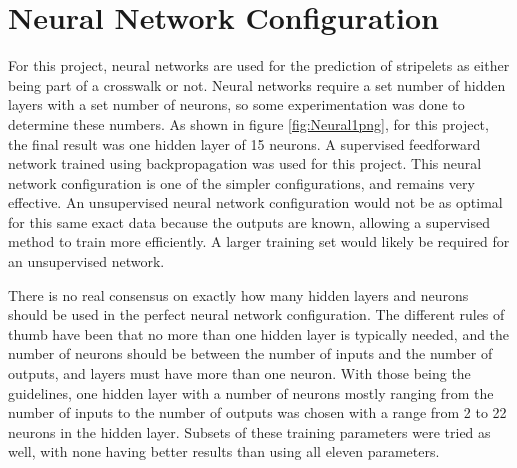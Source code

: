 \documentclass[12pt]{ucthesis}
\begin{document}
\section{Neural Network Configuration}
For this project, neural networks are used for the prediction of stripelets as either being part of a crosswalk or not. Neural networks require a set number of hidden layers with a set number of neurons, so some experimentation was done to determine these numbers. As shown in figure \ref{fig:Neural1png}, for this project, the final result was one hidden layer of 15 neurons. A supervised feedforward network trained using backpropagation was used for this project. This neural network configuration is one of the simpler configurations, and remains very effective. An unsupervised neural network configuration would not be as optimal for this same exact data because the outputs are known, allowing a supervised method to train more efficiently. A larger training set would likely be required for an unsupervised network. 

 

There is no real consensus on exactly how many hidden layers and neurons should be used in the perfect neural network configuration. The different rules of thumb have been that no more than one hidden layer is typically needed, and the number of neurons should be between the number of inputs and the number of outputs, and layers must have more than one neuron\cite{Heaton:2008:INN:1502373}. With those being the guidelines, one hidden layer with a number of neurons mostly ranging from the number of inputs to the number of outputs was chosen with a range from 2 to 22 neurons in the hidden layer. Subsets of these training parameters were tried as well, with none having better results than using all eleven parameters. 
\end{document}
